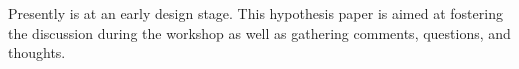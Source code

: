 Presently \Reap is at an early design stage. This hypothesis paper is aimed at
fostering the discussion during the workshop as well as gathering comments,
questions, and thoughts. 

% 
% 
% 
%    
% 
% 
% 
% 
